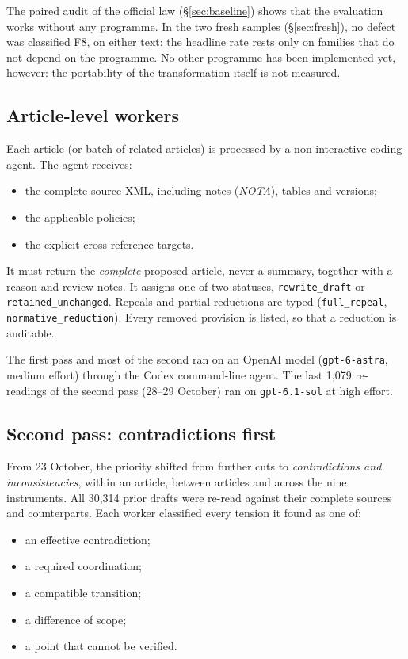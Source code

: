 \documentclass[11pt,a4paper]{article}
\begin{document}
The paired audit of the official law (\S\ref{sec:baseline}) shows that the evaluation works without any programme. In the two fresh samples (\S\ref{sec:fresh}), no defect was classified F8, on either text: the headline rate rests only on families that do not depend on the programme. No other programme has been implemented yet, however: the portability of the transformation itself is not measured.

\subsection{Article-level workers}

Each article (or batch of related articles) is processed by a non-interactive coding agent. The agent receives:
\begin{itemize}
  \item the complete source XML, including notes (\emph{NOTA}), tables and versions;
  \item the applicable policies;
  \item the explicit cross-reference targets.
\end{itemize}
It must return the \emph{complete} proposed article, never a summary, together with a reason and review notes. It assigns one of two statuses, \texttt{rewrite\_draft} or \texttt{retained\_unchanged}. Repeals and partial reductions are typed (\texttt{full\_repeal}, \texttt{normative\_reduction}). Every removed provision is listed, so that a reduction is auditable.

The first pass and most of the second ran on an OpenAI model (\texttt{gpt-6-astra}, medium effort) through the Codex command-line agent. The last 1{,}079 re-readings of the second pass (28--29 October) ran on \texttt{gpt-6.1-sol} at high effort.

\subsection{Second pass: contradictions first}

From 23 October, the priority shifted from further cuts to \emph{contradictions and inconsistencies}, within an article, between articles and across the nine instruments. All 30{,}314 prior drafts were re-read against their complete sources and counterparts. Each worker classified every tension it found as one of:
\begin{itemize}
  \item an effective contradiction;
  \item a required coordination;
  \item a compatible transition;
  \item a difference of scope;
  \item a point that cannot be verified.
\end{itemize}
\end{document}
